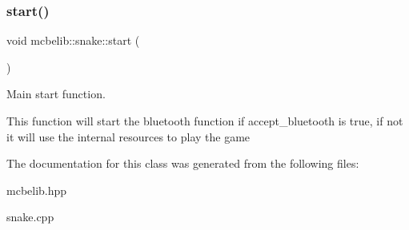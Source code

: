 \subsubsection{\texorpdfstring{start()}{start()}}
{\footnotesize\ttfamily void mcbelib\+::snake\+::start (\begin{DoxyParamCaption}{ }\end{DoxyParamCaption})}



Main start function. 

This function will start the bluetooth function if accept\+\_\+bluetooth is true, if not it will use the internal resources to play the game 

The documentation for this class was generated from the following files\+:\begin{DoxyCompactItemize}
\item 
mcbelib.\+hpp\item 
snake.\+cpp\end{DoxyCompactItemize}
